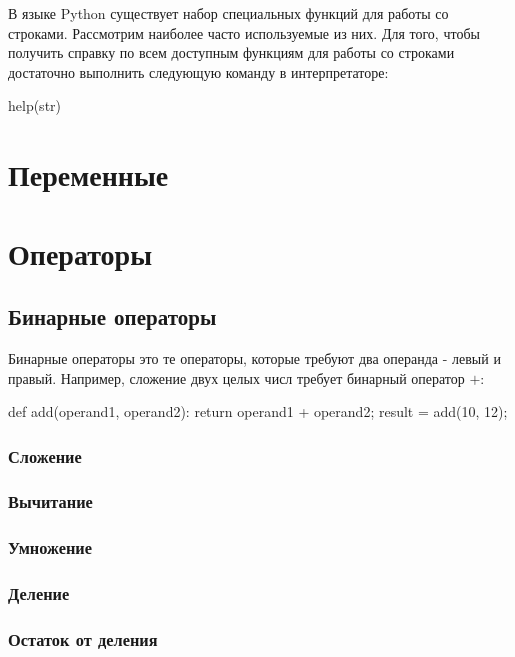 В языке Python существует набор специальных функций для работы со строками.
Рассмотрим наиболее часто используемые из них. Для того, чтобы получить 
справку по всем доступным функциям для работы со строками достаточно выполнить 
следующую команду в интерпретаторе:

\begin{python}
help(str)
\end{python}

\section{Переменные}

\section{Операторы}

\subsection{Бинарные операторы}

Бинарные операторы это те операторы, которые требуют два операнда - левый и 
правый. Например, сложение двух целых числ требует бинарный оператор $+$:

\begin{python}
def add(operand1, operand2):
	return operand1 + operand2;
result = add(10, 12);
\end{python}

\subsubsection{Сложение}

\subsubsection{Вычитание}

\subsubsection{Умножение}

\subsubsection{Деление}

\subsubsection{Остаток от деления}

